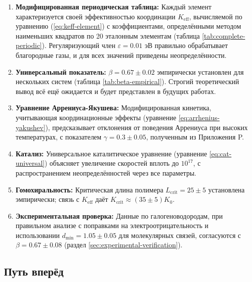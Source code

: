 \documentclass[12pt,a4paper]{article}
\theoremstyle{remark}
\newcommand{\Keff}{K_{\mathrm{eff}}}
\newcommand{\Kcrit}{K_{\mathrm{crit}}}
\begin{document}
	\begin{enumerate}
		\item \textbf{Модифицированная периодическая таблица:} Каждый элемент характеризуется своей эффективностью координации $\Keff$, вычисляемой по уравнению (\ref{eq:keff-element}) с коэффициентами, определёнными методом наименьших квадратов по 20 эталонным элементам (таблица \ref{tab:complete-periodic}). Регуляризующий член $\varepsilon = 0.01$ эВ правильно обрабатывает благородные газы, и для всех значений приведены неопределённости.
		
		\item \textbf{Универсальный показатель:} $\beta = 0.67 \pm 0.02$ эмпирически установлен для нескольких систем (таблица \ref{tab:beta-empirical}). Строгий теоретический вывод всё ещё ожидается и будет представлен в будущих работах.
		
		\item \textbf{Уравнение Аррениуса-Якушева:} Модифицированная кинетика, учитывающая координационные эффекты (уравнение \ref{eq:arrhenius-yakushev}), предсказывает отклонения от поведения Аррениуса при высоких температурах, с показателем $\gamma = 0.3 \pm 0.05$, полученным из Приложения P.
		
		\item \textbf{Катализ:} Универсальное каталитическое уравнение (уравнение \ref{eq:cat-universal}) объясняет увеличение скоростей вплоть до $10^{17}$, с распространением неопределённостей через все параметры.
		
		\item \textbf{Гомохиральность:} Критическая длина полимера $L_{\text{crit}} = 25 \pm 5$ установлена эмпирически; связь с $\Keff$ даёт $\Kcrit \approx (35 \pm 5) K_0$.
		
		\item \textbf{Экспериментальная проверка:} Данные по галогеноводородам, при правильном анализе с поправками на электроотрицательность и использовании $d_{\text{min}} = 1.05 \pm 0.05$ для молекулярных связей, согласуются с $\beta = 0.67 \pm 0.08$ (раздел \ref{sec:experimental-verification}).
	\end{enumerate}
	
	\subsection{Путь вперёд}
	
\end{document}
